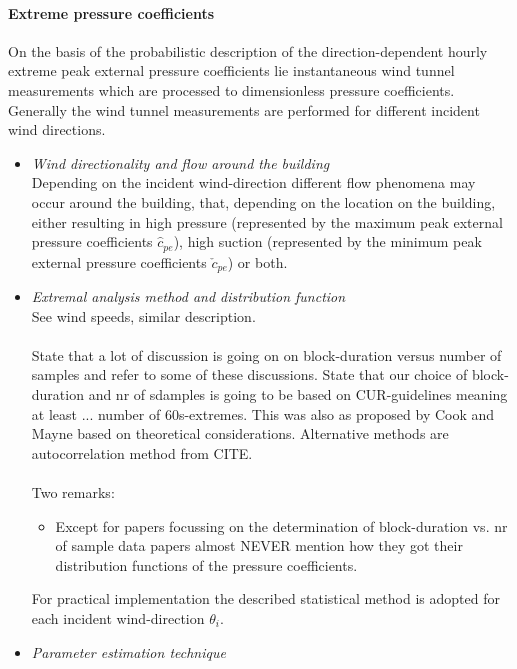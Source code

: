 \paragraph{Extreme pressure coefficients}
On the basis of the probabilistic description of the direction-dependent hourly extreme peak external pressure coefficients lie instantaneous wind tunnel measurements which are processed to dimensionless pressure coefficients. Generally the wind tunnel measurements are performed for different incident wind directions. 
\begin{itemize}
\item
\textit{Wind directionality and flow around the building}\\
Depending on the incident wind-direction different flow phenomena may occur around the building, that, depending on the location on the building, either resulting in high pressure (represented by the maximum peak external pressure coefficients $\hat{c}_{pe}$), high suction (represented by the minimum peak external pressure coefficients $\check{c}_{pe}$) or both. 


\item 
\textit{Extremal analysis method and distribution function}\\
See wind speeds, similar description. \\
\\
State that a lot of discussion is going on on block-duration versus number of samples and refer to some of these discussions.  
State that our choice of block-duration and nr of sdamples is going to be based on CUR-guidelines meaning at least ... number of 60s-extremes. This was also as proposed by Cook and Mayne based on theoretical considerations. Alternative methods are autocorrelation method from CITE. \\
\\
Two remarks:
\begin{itemize}
\item Except for papers focussing on the determination of block-duration vs. nr of sample data papers almost NEVER mention how they got their distribution functions of the pressure coefficients. 
\end{itemize} 


For practical implementation the described statistical method is adopted for each incident wind-direction $\theta_i$. 

\item
\textit{Parameter estimation technique}
\end{itemize}

